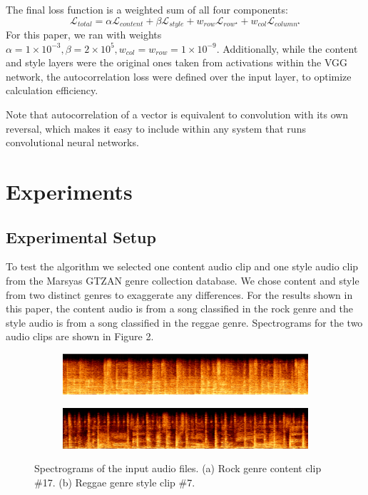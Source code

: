 \documentclass{article}
\begin{document}
The final loss function is a weighted sum of all four components:
$$
\mathcal{L}_{total} = \alpha \mathcal{L}_{content} + \beta \mathcal{L}_{style} + w_{row} \mathcal{L}_{row^\star} + w_{col} \mathcal{L}_{column^\star}
$$
For this paper, we ran with weights $\alpha = 1\times10^{-3}, \beta = 2\times10^{5}, w_{col} = w_{row} = 1\times10^{-9}$. Additionally, while the content and style layers were the original ones taken from activations within the VGG network, the autocorrelation loss were defined over the input layer, to optimize calculation efficiency.

Note that autocorrelation of a vector is equivalent to convolution with its own reversal, which makes it easy to include within any system that runs convolutional neural networks.

\section{Experiments}

\subsection{Experimental Setup}

To test the algorithm we selected one content audio clip and one style audio clip from the Marsyas GTZAN genre collection database. We chose content and style from two distinct genres to exaggerate any differences. For the results shown in this paper, the content audio is from a song classified in the rock genre and the style audio is from a song classified in the reggae genre. Spectrograms for the two audio clips are shown in Figure 2.

\begin{figure}[!ht]
\begin{subfigure}{\textwidth}
  \centering
  \includegraphics[width = \textwidth]{content_spec}
  \caption{}
\end{subfigure}
\begin{subfigure}{\textwidth}
  \centering
  \includegraphics[width = \textwidth]{style_spec}
  \caption{}
\end{subfigure}
\caption{Spectrograms of the input audio files. (a) Rock genre content clip \#17. (b) Reggae genre style clip \#7.}
\end{figure}
\end{document}
